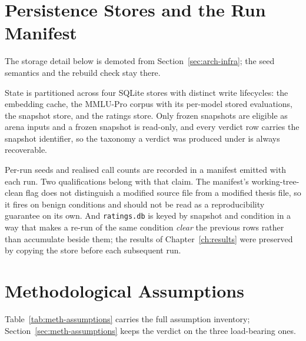 \section{Persistence Stores and the Run Manifest}\label{sec:num-persistence}

The storage detail below is demoted from Section~\ref{sec:arch-infra};
the seed semantics and the rebuild check stay there.

State is partitioned across four SQLite stores with distinct write
lifecycles: the embedding cache, the MMLU-Pro corpus with its per-model
stored evaluations, the snapshot store, and the ratings store. Only
frozen snapshots are eligible as arena inputs and a frozen snapshot is
read-only, and every verdict row carries the snapshot identifier, so
the taxonomy a verdict was produced under is always recoverable.

Per-run seeds and realised call counts are recorded in a manifest
emitted with each run. Two qualifications belong with that claim. The
manifest's working-tree-clean flag does not distinguish a modified
source file from a modified thesis file, so it fires on benign
conditions and should not be read as a reproducibility guarantee on
its own. And \texttt{ratings.db} is keyed by snapshot and condition in
a way that makes a re-run of the same condition \emph{clear} the
previous rows rather than accumulate beside them; the results of
Chapter~\ref{ch:results} were preserved by copying the store before
each subsequent run.

\section{Methodological Assumptions}\label{sec:num-assumptions}

Table~\ref{tab:meth-assumptions} carries the full assumption
inventory; Section~\ref{sec:meth-assumptions} keeps the verdict on the
three load-bearing ones.

